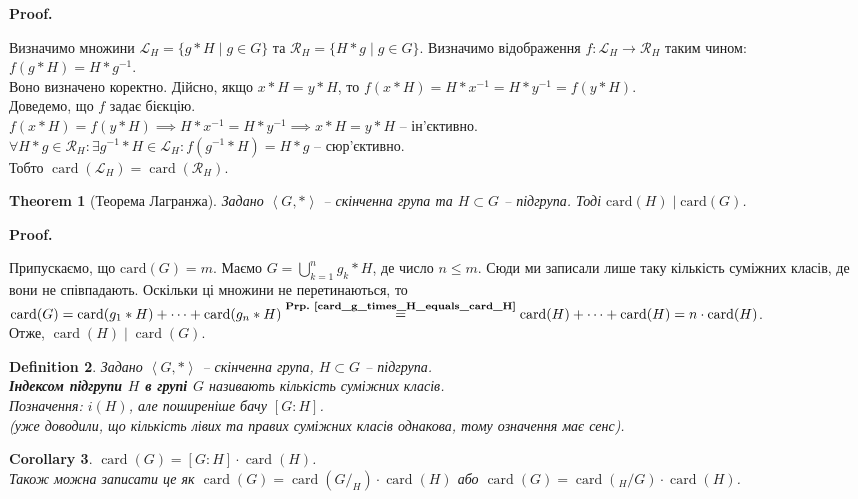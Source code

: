 \documentclass[a4paper, 10pt]{article}
\makeatletter
\theoremstyle{theoremdd}
\newtheorem{theorem}{Theorem}[subsection]
\theoremstyle{theoremdd}
\newtheorem{definition}[theorem]{Definition}
\theoremstyle{theoremdd}
\theoremstyle{theoremdd}
\theoremstyle{theoremdd}
\theoremstyle{theoremdd}
\theoremstyle{theoremdd}
\theoremstyle{theoremdd}
\theoremstyle{theoremdd}
\theoremstyle{theoremdd}
\theoremstyle{theoremdd}
\theoremstyle{theoremdd}
\theoremstyle{theoremdd}
\theoremstyle{theoremdd}
\newtheorem{corollary}[theorem]{Corollary}
\theoremstyle{theoremdd}
\renewenvironment{proof}[1][Proof.\\]{\par
\pushQED{\hfill \qed}%
\normalfont \topsep6\p@\@plus6\p@\relax
\trivlist
\item\relax
{\bfseries
#1\@addpunct{.}}\hspace\labelsep\ignorespaces
}{%
\popQED\endtrivlist\@endpefalse
}
\DeclareMathOperator{\card}{card}
\newcommand\prpref[1]{\textbf{Prp.~\ref{#1}}}
\makeatother
\begin{document}
\begin{proof}
Визначимо множини $\mathcal{L}_H = \{g*H \mid g \in G\}$ та $\mathcal{R}_H = \{H*g \mid g \in G\}$. Визначимо відображення $f \colon \mathcal{L}_H \to \mathcal{R}_H$ таким чином: $f(g*H) = H*g^{-1}$.\\
Воно визначено коректно. Дійсно, якщо $x*H = y*H$, то $f(x*H) = H*x^{-1} =H*y^{-1} = f(y*H)$.\\
Доведемо, що $f$ задає бієкцію.\\
$f(x*H) = f(y*H) \implies H*x^{-1} = H*y^{-1} \implies x*H = y*H$ -- ін'єктивно.\\
$\forall H*g \in \mathcal{R}_H: \exists g^{-1}*H \in \mathcal{L}_H: f(g^{-1}*H) = H*g$ -- сюр'єктивно.\\
Тобто $\card(\mathcal{L}_H) = \card(\mathcal{R}_H)$.
\end{proof}

\begin{theorem}[Теорема Лагранжа]
Задано $\left<G,* \right>$ -- скінченна група та $H \subset G$ -- підгрупа. Тоді $\text{card}(H) \mid \text{card}(G)$.
\end{theorem}

\begin{proof}
Припускаємо, що $\text{card}(G) = m$. Маємо $G = \displaystyle\bigcup_{k=1}^n g_k*H$, де число $n \leq m$. Сюди ми записали лише таку кількість суміжних класів, де вони не співпадають. Оскільки ці множини не перетинаються, то $\card(G) = \card(g_1*H) + \dots + \card(g_n*H) \overset{\text{\prpref{card_g_times_H_equals_card_H}}}{=} \card(H) + \dots + \card(H) = n \cdot \card(H)$.\\
Отже, $\card(H) \mid \card(G)$.
\end{proof}

\begin{definition}
Задано $\left< G, * \right>$ -- скінченна група, $H \subset G$ -- підгрупа.\\
\textbf{Індексом підгрупи $H$ в групі $G$} називають кількість суміжних класів.\\
Позначення: $i(H)$, але поширеніше бачу $[G:H]$.\\
(уже доводили, що кількість лівих та правих суміжних класів однакова, тому означення має сенс).
\end{definition}

\begin{corollary}
$\card(G) = [G:H] \cdot \card(H)$.\\
Також можна записати це як $\card(G) = \card(G/_H) \cdot \card(H)$ або $\card(G) = \card({}_{H}{/G}) \cdot \card(H)$.
\end{corollary}
\end{document}
